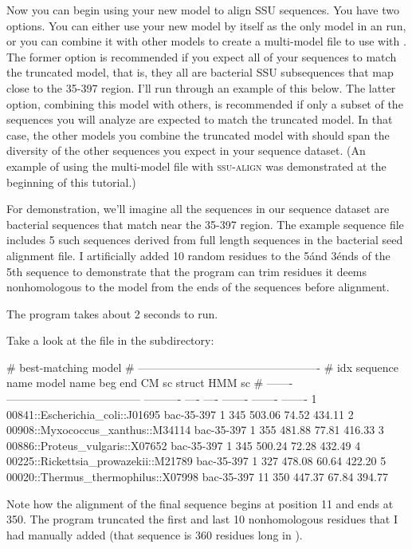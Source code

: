 Now you can begin using your new model  to align
SSU sequences. You have two options.  You can either use your new
model by itself as the only model in an  run, or you
can combine it with other models to create a multi-model file to use
with . The former option is recommended if you expect
all of your sequences to match the truncated model, that is, they all
are bacterial SSU subsequences that map close to the 35-397
region. I'll run through an example of this below. The latter option,
combining this model with others, is recommended if only a subset of
the sequences you will analyze are expected to match the truncated
model. In that case, the other models you combine the truncated model
with should span the diversity of the other sequences you expect in
your sequence dataset. (An example of using the multi-model file
 with \textsc{ssu-align} was
demonstrated at the beginning of this tutorial.)

For demonstration, we'll imagine all the sequences in our sequence
dataset are bacterial sequences that match near the 35-397 region. The
example sequence file  includes 5 such sequences
derived from full length sequences in the bacterial seed alignment
 file. I artificially added 10
random residues to the 5\' and 3\' ends of the 5th sequence to
demonstrate that the program can trim residues it deems nonhomologous
to the model from the ends of the sequences before alignment.


The program takes about 2 seconds to run. 

Take a look at the  file in the 
subdirectory:

\begin{sreoutput}
#                                                               best-matching model               
#                                                -------------------------------------------------
#     idx  sequence name                         model name   beg   end    CM sc   struct   HMM sc
# -------  ------------------------------------  ----------  ----  ----  -------  -------  -------
        1  00841::Escherichia_coli::J01695       bac-35-397     1   345   503.06    74.52   434.11
        2  00908::Myxococcus_xanthus::M34114     bac-35-397     1   355   481.88    77.81   416.33
        3  00886::Proteus_vulgaris::X07652       bac-35-397     1   345   500.24    72.28   432.49
        4  00225::Rickettsia_prowazekii::M21789  bac-35-397     1   327   478.08    60.64   422.20
        5  00020::Thermus_thermophilus::X07998   bac-35-397    11   350   447.37    67.84   394.77
\end{sreoutput}

Note how the alignment of the final sequence begins at position 11 and
ends at 350. The program truncated the first and last 10 nonhomologous
residues that I had manually added (that sequence is 360 residues long
in ).
